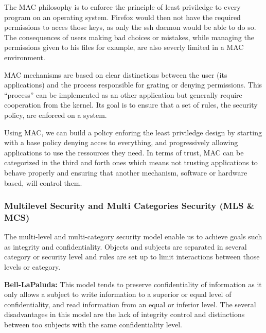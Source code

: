 \documentclass[pdftex,a4paper,titlepage,11pt]{article}
\begin{document}
\bigskip

The MAC philosophy is to enforce the principle of least priviledge to every
program on an operating system. Firefox would then not have the required
permissions to acces those keys, as only the ssh daemon would be able to do so.
The consequences of users making bad choices or mistakes, while managing the
permissions given to his files for example, are also severly limited in a MAC
environment.

\bigskip

MAC mechanisms are based on clear distinctions between the user (its
applications) and the process responsible for grating or denying permissions.
This ``process'' can be implemented as an other application but generally
require cooperation from the kernel. Its goal is to ensure that a set of rules,
the security policy, are enforced on a system.

\bigskip

Using MAC, we can build a policy enforing the least priviledge design by
starting with a base policy denying acces to everything, and progressively
allowing applications to use the ressources they need. In terms of trust, MAC
can be categorized in the third and forth ones which means not trusting
applications to behave properly and ensuring that another mechanism, software or
hardware based, will control them.

\subsubsection{Multilevel Security and Multi Categories Security (MLS \& MCS)}

The multi-level and multi-category security model enable us to achieve goals
such as integrity and confidentiality. Objects and subjects are separated in
several category or security level and rules are set up to limit interactions
between those levels or category.

\bigskip

\textbf{Bell-LaPaluda:} This model tends to preserve confidentiality of
information as it only allows a subject to write information to a superior or
equal level of confidentiality, and read information from an equal or inferior
level. The several disadvantages in this model are the lack of integrity control
and distinctions between too subjects with the same confidentiality level.
\end{document}
